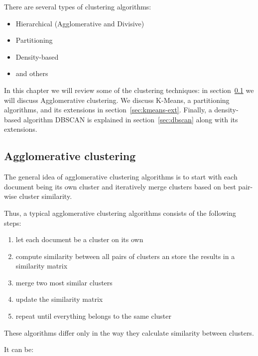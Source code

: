 There are several types of clustering algorithms:

\begin{itemize}
\itemsep1pt\parskip0pt
  \item Hierarchical (Agglomerative and Divisive)
  \item Partitioning
  \item Density-based
  \item and others
\end{itemize}

In this chapter we will review some of the clustering techniques:
in section~\ref{sec:clustering-heierarchical} we will discuss
Agglomerative clustering. We discuss K-Means, a partitioning algorithms,
and its extensions in section~\ref{sec:kmeans-ext}.
Finally, a density-based algorithm DBSCAN is explained in
section~\ref{sec:dbscan} along with its extensions.


\subsection{Agglomerative clustering} \label{sec:clustering-heierarchical}

The general idea of agglomerative clustering algorithms is to start with
each document being its own cluster and iteratively merge clusters based
on best pair-wise cluster similarity.

Thus, a typical agglomerative clustering algorithms consists of the following steps:

\begin{enumerate}
\itemsep1pt\parskip0pt
  \item let each document be a cluster on its own
  \item compute similarity between all pairs of clusters an store the
      results in a similarity matrix
  \item merge two most similar clusters
  \item update the similarity matrix
  \item repeat until everything belongs to the same cluster
\end{enumerate}

These algorithms differ only in the way they calculate
similarity between clusters.

It can be:

